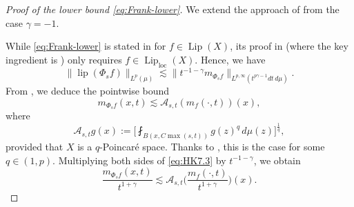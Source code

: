 \documentclass[11pt]{amsart}
\theoremstyle{definition}
\theoremstyle{remark}
\numberwithin{equation}{section}
\newcommand{\Norm}[2]{\|#1\|_{#2}}
\begin{document}
\begin{proof}[Proof of the lower bound \eqref{eq:Frank-lower}]
We extend the approach of \cite{HK:W1p} from the case $\gamma=-1$.

While \eqref{eq:Frank-lower} is stated in \cite[Corollary 1.13]{DLYYZ} for
$f\in\operatorname{Lip}(X)$, its proof in \cite[Section 2.2]{DLYYZ} (where the key
ingredient is \cite[Proposition 6.3]{HK:W1p}) only requires
$f\in\operatorname{Lip}_{\mathrm{loc}}(X)$. Hence, we have
\begin{equation}\label{eq:1.13Phis}
  \Norm{\operatorname{lip}(\Phi_s f)}{L^p(\mu)}
  \lesssim\Norm{t^{-1-\gamma}m_{\Phi_s f}}{L^{p,\infty}(t^{p\gamma-1}dt\,d\mu)}.
\end{equation}
From \cite[Lemma 7.3]{HK:W1p}, we deduce the pointwise bound
\begin{equation}\label{eq:HK7.3}
  m_{\Phi_s f}(x,t)
  \lesssim\mathcal A_{s,t}( m_f(\cdot,t))(x),
\end{equation}
where
\begin{equation*}
  \mathcal A_{s,t}g(x)
  := \Big[\fint_{B(x, C\max(s,t))} g(z)^q\, d\mu(z)\Big]^{\frac 1q},
\end{equation*}
provided that $X$ is a $q$-Poincar\'e space. Thanks to \cite{KZ:08}, this is the case for
some $q\in(1,p)$. Multiplying both sides of  \eqref{eq:HK7.3} by $t^{-1-\gamma}$, we obtain
\begin{equation}\label{eq:HK7.3b}
  \frac{m_{\Phi_s f}(x,t)}{t^{1+\gamma}}
  \lesssim
  \mathcal A_{s,t}\Big(\frac{m_f(\cdot,t)}{t^{1+\gamma}}\Big)(x).
\end{equation}


\end{proof}
\end{document}
